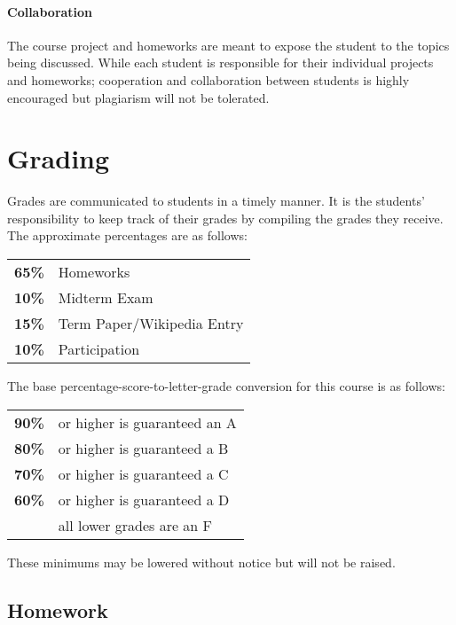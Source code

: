 \documentclass[12pt]{scrartcl}
\begin{document}
\paragraph{Collaboration} 
The course project and homeworks are meant to expose the student to the topics being discussed. 
While each student is responsible for their individual projects and homeworks; 
cooperation and collaboration between students is highly encouraged but plagiarism will not be tolerated.

\section{Grading}

Grades are communicated to students in a timely manner. 
It is the students’ responsibility to keep track of their grades by compiling the grades they receive. 
The approximate percentages are as follows:
\begin{center}
\begin{tabular}{rl}
\textbf{65\% } & Homeworks\\
\textbf{10\% } & Midterm Exam\\
\textbf{15\% } & Term Paper/Wikipedia Entry \\
\textbf{10\% } & Participation\\
\end{tabular}
\end{center}

The base percentage-score-to-letter-grade conversion for this course is as follows: 
\begin{center}
\begin{tabular}{rl}
\textbf{90\%}& or higher is guaranteed an A \\
\textbf{80\%}& or higher is guaranteed a B \\
\textbf{70\%}& or higher is guaranteed a C \\
\textbf{60\%}& or higher is guaranteed a D \\
\textbf{}& all lower grades are an F 
\end{tabular}
\end{center}
These minimums may be lowered without notice but will not be raised. 


\subsection{Homework }
\end{document}

